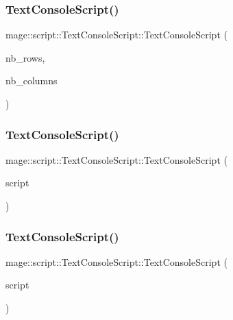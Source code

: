 \subsubsection{\texorpdfstring{Text\+Console\+Script()}{TextConsoleScript()}\hspace{0.1cm}{\footnotesize\ttfamily [1/3]}}
{\footnotesize\ttfamily mage\+::script\+::\+Text\+Console\+Script\+::\+Text\+Console\+Script (\begin{DoxyParamCaption}\item[{\hyperlink{namespacemage_a41c104c036fba3756a74e19f793eeaa1}{U32}}]{nb\+\_\+rows,  }\item[{\hyperlink{namespacemage_a41c104c036fba3756a74e19f793eeaa1}{U32}}]{nb\+\_\+columns }\end{DoxyParamCaption})\hspace{0.3cm}{\ttfamily [explicit]}}

\hypertarget{classmage_1_1script_1_1_text_console_script_a82c8a2c15aa51befbfe6341e463057db}{}\label{classmage_1_1script_1_1_text_console_script_a82c8a2c15aa51befbfe6341e463057db} 
\subsubsection{\texorpdfstring{Text\+Console\+Script()}{TextConsoleScript()}\hspace{0.1cm}{\footnotesize\ttfamily [2/3]}}
{\footnotesize\ttfamily mage\+::script\+::\+Text\+Console\+Script\+::\+Text\+Console\+Script (\begin{DoxyParamCaption}\item[{const \hyperlink{classmage_1_1script_1_1_text_console_script}{Text\+Console\+Script} \&}]{script }\end{DoxyParamCaption})}

\hypertarget{classmage_1_1script_1_1_text_console_script_a46052af67069fef12a8ff9de75cce382}{}\label{classmage_1_1script_1_1_text_console_script_a46052af67069fef12a8ff9de75cce382} 
\subsubsection{\texorpdfstring{Text\+Console\+Script()}{TextConsoleScript()}\hspace{0.1cm}{\footnotesize\ttfamily [3/3]}}
{\footnotesize\ttfamily mage\+::script\+::\+Text\+Console\+Script\+::\+Text\+Console\+Script (\begin{DoxyParamCaption}\item[{\hyperlink{classmage_1_1script_1_1_text_console_script}{Text\+Console\+Script} \&\&}]{script }\end{DoxyParamCaption})\hspace{0.3cm}{\ttfamily [noexcept]}}

